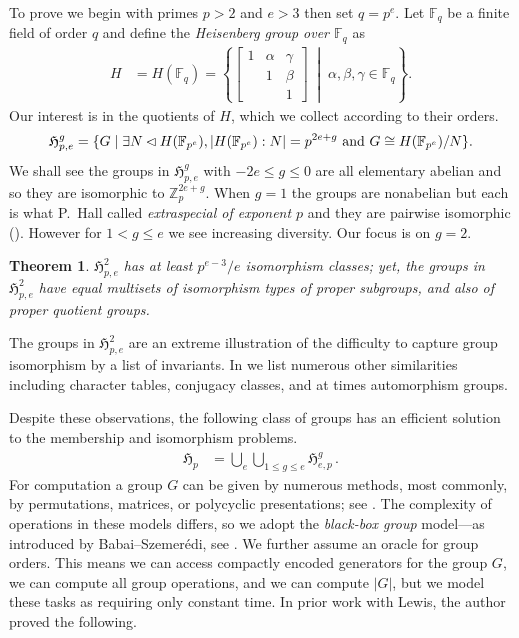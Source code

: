 \documentclass{toc}
\numberwithin{equation}{section}
\theoremstyle{plain}       %
\newtheorem{thm}[equation]{Theorem}
\theoremstyle{remark}
\theoremstyle{definition}
\numberwithin{figure}{section}
\numberwithin{table}{section}
\newcommand{\mygroups}{\mathfrak{H}}
\newcommand{\bbF}{\mathbb{F}}  %
\begin{document}
To prove  we begin with primes $p>2$ and $e>3$ then set
$q=p^e$.  Let $\bbF_q$ be a finite field of order $q$ and define the
\emph{Heisenberg group over $\bbF_q$} as
\begin{align}
	H & = H(\bbF_q) = \left\{
		\begin{bmatrix} 
			1 & \alpha & \gamma \\
			  & 1 & \beta\\
			  & & 1
		\end{bmatrix}
		\;\middle|\;
		\alpha,\beta,\gamma\in \bbF_q\right\}.
\end{align}
Our interest is in the quotients of $H$, which we collect according to their
orders.
\begin{align}
	\mygroups_{p,e}^{g}  = \{G \mid \exists N\lhd H(\bbF_{p^e}), 
		|H(\bbF_{p^e}):N|=p^{2e+g}\textnormal{ and }G\cong H(\bbF_{p^e})/N\}.
\end{align}
We shall see the groups in $\mygroups_{p,e}^{g}$ with $-2e \leq g\leq 0$ are all
elementary abelian and so they are isomorphic to $\mathbb{Z}_p^{2e+g}$.  When
$g=1$ the groups are nonabelian but each is what P.\ Hall called
\emph{extraspecial of exponent $p$} and they are pairwise isomorphic
(). However for $1<g\leq e$ we see increasing
diversity.  Our focus is on $g=2$.


\begin{thm}\label{thm:main}
  $\mygroups_{p,e}^{2}$ has at least $p^{e-3}/e$ isomorphism classes;
  yet, the groups in $\mygroups_{p,e}^{2}$ have equal multisets of
  isomorphism types of proper subgroups, and also of proper quotient
  groups.
\end{thm}

The groups in $\mygroups_{p,e}^{2}$ are an extreme illustration of the
difficulty to capture group isomorphism by a list of invariants.  In
 we list numerous other similarities including
character tables, conjugacy classes, and at times automorphism groups.  
%
%
%

Despite these observations, the following class of groups has an efficient
solution to the membership and isomorphism problems.
\begin{align}
	\mygroups_p & = \bigcup_e\bigcup_{1\leq g\leq e} \mygroups_{e,p}^{g}\,.
\end{align}
For computation a group $G$ can be given by numerous methods, most commonly, by
permutations, matrices, or polycyclic presentations;
%
see \cite{Seress}.    %
The complexity of operations in these models differs, so we adopt the
\emph{black-box group} model---as introduced by Babai--Szemer\'edi, see
\cite[Chapter 2]{Seress}. We further assume an oracle for group orders.  This
means we can access compactly encoded generators for the group $G$, we can
compute all group operations, and we can compute $|G|$, but we model these tasks
as requiring only constant time.    In prior work with Lewis, the author proved
the following.
\end{document}
